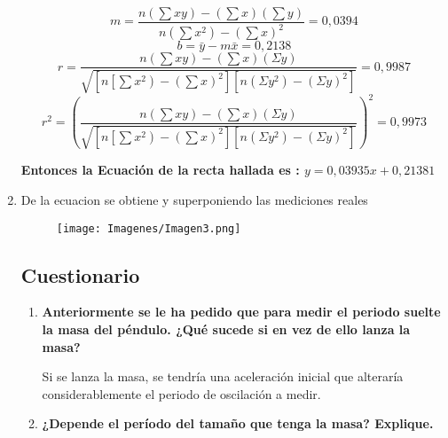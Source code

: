\begin{enumerate}
\begin{equation*}
     m=\dfrac{n\left(\sum x y\right)-\left(\sum x\right)\left(\sum y\right)}{n\left(\sum x^2\right)-\left(\sum x\right)^2}=0,0394
 \end{equation*}
\begin{equation*}
    b=\bar{y}-m \bar{x}=0,2138
\end{equation*} 
 \begin{equation*}
r=\dfrac{n\left(\sum x y\right)-\left(\sum x\right)(\Sigma y)}{\sqrt{\left[n\left[\sum x^2\right)-\left(\sum x\right)^2\right]\left[n\left(\Sigma y^2\right)-(\Sigma y)^2\right]}}=0,9987
 \end{equation*}
\begin{equation*}
r^2=(\dfrac{n\left(\sum x y\right)-\left(\sum x\right)(\Sigma y)}{\sqrt{\left[n\left[\sum x^2\right)-\left(\sum x\right)^2\right]\left[n\left(\Sigma y^2\right)-(\Sigma y)^2\right]}})^2=0,9973
 \end{equation*}

\textbf{Entonces la Ecuación de la recta hallada es : $y = 0,03935x + 0,21381$}
\item De la ecuacion se obtiene y superponiendo las mediciones reales

\begin{figure}[H]
	\begin{center}
 		\texttt{[image: Imagenes/Imagen3.png]}
	\end{center} 
\end{figure}


\subsection{Cuestionario}
\begin{enumerate}
    \item \textbf{Anteriormente se le ha pedido que para medir el periodo suelte la masa del péndulo. ¿Qué sucede si en vez de ello lanza la masa?}

    Si se lanza la masa, se tendría una aceleración inicial que alteraría considerablemente el periodo de oscilación a medir.
    \item \textbf{¿Depende el per\'iodo del tamaño que tenga la masa? Explique.}


\end{enumerate}
\end{enumerate}
